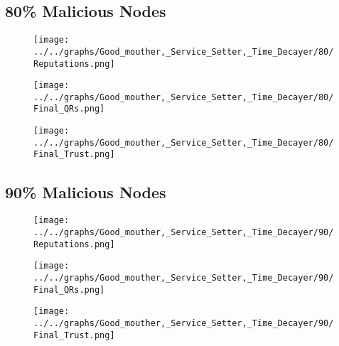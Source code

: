\begin{minipage}[t]{0.49\columnwidth}
\subsection*{80\% Malicious Nodes}
    \begin{figure}[H]
        \centering
        \texttt{[image: ../../graphs/Good\_mouther,\_Service\_Setter,\_Time\_Decayer/80/Reputations.png]}
    \end{figure}
    \begin{figure}[H]
        \centering
        \texttt{[image: ../../graphs/Good\_mouther,\_Service\_Setter,\_Time\_Decayer/80/Final\_QRs.png]}
    \end{figure}
\end{minipage}
\begin{minipage}[t]{0.49\columnwidth}
    \begin{figure}[H]
        \centering
        \texttt{[image: ../../graphs/Good\_mouther,\_Service\_Setter,\_Time\_Decayer/80/Final\_Trust.png]}
    \end{figure}
\end{minipage}

\begin{minipage}[t]{0.49\columnwidth}
\subsection*{90\% Malicious Nodes}
    \begin{figure}[H]
        \centering
        \texttt{[image: ../../graphs/Good\_mouther,\_Service\_Setter,\_Time\_Decayer/90/Reputations.png]}
    \end{figure}
    \begin{figure}[H]
        \centering
        \texttt{[image: ../../graphs/Good\_mouther,\_Service\_Setter,\_Time\_Decayer/90/Final\_QRs.png]}
    \end{figure}
\end{minipage}
\begin{minipage}[t]{0.49\columnwidth}
    \begin{figure}[H]
        \centering
        \texttt{[image: ../../graphs/Good\_mouther,\_Service\_Setter,\_Time\_Decayer/90/Final\_Trust.png]}
    \end{figure}
\end{minipage}
\newpage

